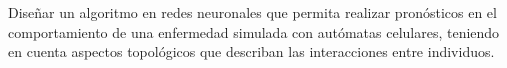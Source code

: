 
Diseñar un algoritmo en redes neuronales que permita realizar pronósticos en el comportamiento de una enfermedad simulada con autómatas celulares, teniendo en cuenta aspectos topológicos que describan las interacciones entre individuos.
